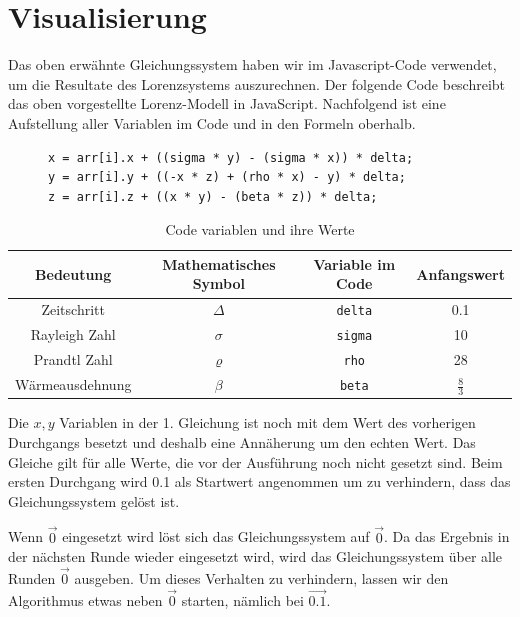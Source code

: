 
\section{Visualisierung}\label{visualisierung}
Das oben erwähnte Gleichungssystem haben wir im Javascript-Code verwendet, um die Resultate des Lorenzsystems auszurechnen. Der folgende Code beschreibt das oben vorgestellte Lorenz-Modell in JavaScript. Nachfolgend ist eine Aufstellung aller Variablen im Code und in den Formeln oberhalb.

\begin{figure}
	\begin{lstlisting}[style=C]
x = arr[i].x + ((sigma * y) - (sigma * x)) * delta;
y = arr[i].y + ((-x * z) + (rho * x) - y) * delta;
z = arr[i].z + ((x * y) - (beta * z)) * delta;
		\end{lstlisting}
\end{figure}

	\begin{table}[]
		\begin{tabular}{| c | c | c | c |}
			\hline
			\textbf{Bedeutung} & \textbf{Mathematisches Symbol} & \textbf{Variable im Code} & \textbf{Anfangswert}\\\hline
			Zeitschritt & $ \Delta $ & \texttt{delta} & 0.1 \\\hline
			Rayleigh Zahl & $ \sigma $ & \texttt{sigma} & 10 \\\hline
			Prandtl Zahl & $\varrho $ & \texttt{rho} & 28 \\\hline
			Wärmeausdehnung & $\beta $ & \texttt{beta}  & $ \frac{8}{3} $ \\\hline
		\end{tabular}
		\caption{Code variablen und ihre Werte\label{CodeVariablen}}
	\end{table}
	
Die $ x, y $ Variablen in der 1. Gleichung ist noch mit dem Wert des vorherigen Durchgangs besetzt und deshalb eine Annäherung um den echten Wert. Das Gleiche gilt für alle Werte, die vor der Ausführung noch nicht gesetzt sind. 
Beim ersten Durchgang wird 0.1 als Startwert angenommen um zu verhindern, dass das Gleichungssystem gelöst ist. 

Wenn $ \vec{0} $ eingesetzt wird löst sich das Gleichungssystem auf $ \vec{0} $. Da das Ergebnis in der nächsten Runde wieder eingesetzt wird, wird das Gleichungssystem über alle Runden $ \vec{0} $ ausgeben. Um dieses Verhalten zu verhindern, lassen wir den Algorithmus etwas neben $ \vec{0} $ starten, nämlich bei $ \vec{0.1} $.

